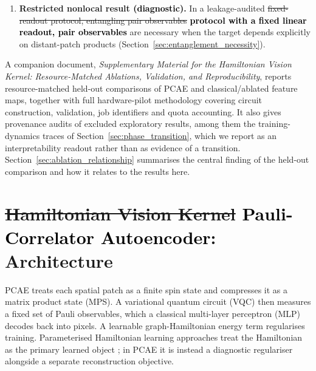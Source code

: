 \documentclass[pdflatex,sn-basic]{sn-jnl}
\newcommand{\del}[1]{\sout{#1}}
\newcommand{\add}[1]{\textbf{\textcolor{black}{#1}}}
\begin{document}
\begin{enumerate}
{        construction gives the same exactness for a purely classical feature
        map} (Supplementary
        Material). \del{We therefore report it as a property the assembled pipeline
        provides, not as a quantum result.} \add{We report it as a design property
        of the pipeline.}
  \item \textbf{Restricted nonlocal result \add{(diagnostic)}.} In a leakage-audited \del{fixed-readout
        protocol, entangling pair observables} \add{protocol with a fixed
        linear readout, pair observables} are necessary when the target
        depends explicitly on distant-patch products
        (Section~\ref{sec:entanglement_necessity}).
\end{enumerate}

A companion document, \textit{Supplementary Material for the Hamiltonian Vision
Kernel: Resource-Matched Ablations, Validation, and Reproducibility}, reports
resource-matched held-out comparisons of PCAE and classical/ablated feature maps,
together with full hardware-pilot methodology covering circuit construction,
validation, job identifiers and quota accounting. It also gives provenance audits
of excluded exploratory results, among them the training-dynamics traces of
Section~\ref{sec:phase_transition}, which we report as an interpretability
readout rather than as evidence of a transition.
Section~\ref{sec:ablation_relationship} summarises the central finding of the
held-out comparison and how it relates to the results here.

\section[Pauli-Correlator Autoencoder: Architecture]{\del{Hamiltonian Vision Kernel} \add{Pauli-Correlator Autoencoder}: Architecture}
\label{sec:architecture}

\color{blue}
PCAE treats each spatial patch as a finite spin state and compresses it as a
matrix product state (MPS). A variational quantum circuit (VQC) then measures a
fixed set of Pauli observables, which a classical multi-layer perceptron (MLP)
decodes back into pixels. A learnable graph-Hamiltonian energy term regularises
training. Parameterised Hamiltonian learning approaches treat the Hamiltonian as
the primary learned object \citep{Shi2022}; in PCAE it is instead a diagnostic
regulariser alongside a separate reconstruction objective.
\end{document}
